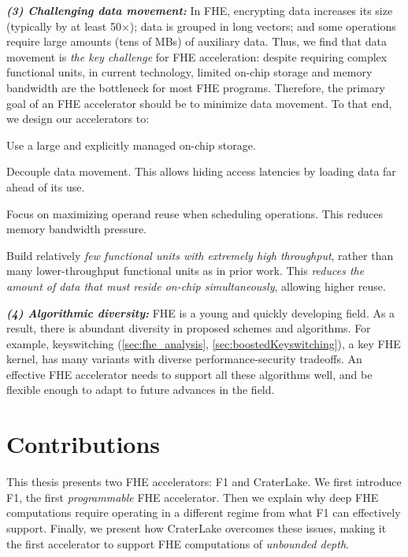 \noindent \textbf{\emph{(3) Challenging data movement:}}
In FHE, encrypting data increases its size (typically by at least 50$\times$);
data is grouped in long vectors; and some operations require large amounts
(tens of MBs) of auxiliary data. Thus, we find that data movement is \emph{the
key challenge} for FHE acceleration: despite requiring complex functional
units, in current technology, limited on-chip storage and memory bandwidth are
the bottleneck for most FHE programs. Therefore, the primary goal of an FHE
accelerator should be to minimize data movement. To that end, we design our
accelerators to:
\begin{compactenum}
\item Use a large and explicitly managed on-chip storage.
\item Decouple data movement. This allows hiding access latencies by
    loading data far ahead of its use.
\item Focus on maximizing operand reuse when scheduling operations. This reduces
    memory bandwidth pressure.
\item Build relatively \emph{few functional units with extremely high
    throughput}, rather than many lower-throughput functional units as in prior
    work. This \emph{reduces the amount of data that must reside on-chip
    simultaneously}, allowing higher reuse.
\end{compactenum}

\noindent \textbf{\emph{(4) Algorithmic diversity:}}
FHE is a young and quickly developing field. As a result, there is abundant
diversity in proposed schemes and algorithms. For example, keyswitching
(\autoref{sec:fhe_analysis}, \autoref{sec:boostedKeyswitching}), a key FHE
kernel, has many variants with diverse performance-security tradeoffs. An
effective FHE accelerator needs to support all these algorithms well, and be
flexible enough to adapt to future advances in the field.

\section{Contributions}
\label{sec:contributions}

This thesis presents two FHE accelerators: F1 and CraterLake. We first introduce
F1, the first \emph{programmable} FHE accelerator. Then we explain why deep FHE
computations require operating in a different regime from what F1 can
effectively support. Finally, we present how CraterLake overcomes these issues,
making it the first accelerator to support FHE computations of \emph{unbounded
depth}.

